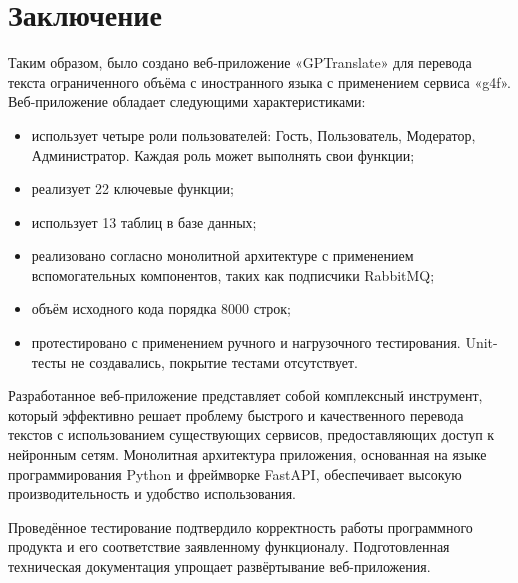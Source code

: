 \clearpage
\section*{Заключение}

Таким образом, было создано веб-приложение «GPTranslate» для перевода текста ограниченного объёма с иностранного языка с применением сервиса «g4f». Веб-приложение обладает следующими характеристиками:

\begin{itemize}
    \item использует четыре роли пользователей: Гость, Пользователь, Модератор, Администратор. Каждая роль может выполнять свои функции;
    \item реализует 22 ключевые функции;
    \item использует 13 таблиц в базе данных;
    \item реализовано согласно монолитной архитектуре с применением вспомогательных компонентов, таких как подписчики RabbitMQ;
    \item объём исходного кода порядка 8000 строк;
    \item протестировано с применением ручного и нагрузочного тестирования. Unit-тесты не создавались, покрытие тестами отсутствует.
\end{itemize}

Разработанное веб-приложение представляет собой комплексный инструмент, который эффективно решает проблему быстрого и качественного перевода текстов с использованием существующих сервисов, предоставляющих доступ к нейронным сетям. Монолитная архитектура приложения, основанная на языке программирования Python и фреймворке FastAPI, обеспечивает высокую производительность и удобство использования.

Проведённое тестирование подтвердило корректность работы программного продукта и его соответствие заявленному функционалу. Подготовленная техническая документация упрощает развёртывание веб-приложения.